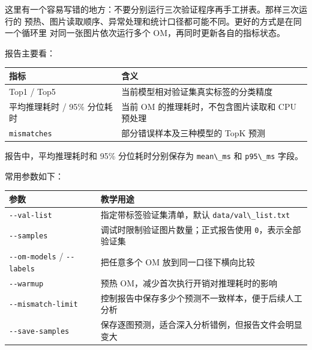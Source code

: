 这里有一个容易写错的地方：不要分别运行三次验证程序再手工拼表。那样三次运行的
预热、图片读取顺序、异常处理和统计口径都可能不同。更好的方式是在同一个循环里
对同一张图片依次运行多个 OM，再同时更新各自的指标状态。

报告主要看：

\begin{longtable}[]{@{}
  >{\raggedright\arraybackslash}p{}
  >{\raggedright\arraybackslash}p{}@{}}
\toprule\noalign{}
\begin{minipage}[b]{\linewidth}\raggedright
指标
\end{minipage} & \begin{minipage}[b]{\linewidth}\raggedright
含义
\end{minipage} \\
\midrule\noalign{}
\endhead
\bottomrule\noalign{}
\endlastfoot
Top1 / Top5 & 当前模型相对验证集真实标签的分类精度 \\
平均推理耗时 / 95\% 分位耗时 & 当前 OM 的推理耗时，不包含图片读取和 CPU
预处理 \\
\passthrough{\lstinline!mismatches!} & 部分错误样本及三种模型的 TopK
预测 \\
\end{longtable}

报告中，平均推理耗时和 95\% 分位耗时分别保存为
\passthrough{\lstinline!mean\_ms!} 和 \passthrough{\lstinline!p95\_ms!}
字段。

常用参数如下：

\begin{longtable}[]{@{}
  >{\raggedright\arraybackslash}p{}
  >{\raggedright\arraybackslash}p{}@{}}
\toprule\noalign{}
\begin{minipage}[b]{\linewidth}\raggedright
参数
\end{minipage} & \begin{minipage}[b]{\linewidth}\raggedright
教学用途
\end{minipage} \\
\midrule\noalign{}
\endhead
\bottomrule\noalign{}
\endlastfoot
\passthrough{\lstinline!--val-list!} & 指定带标签验证集清单，默认
\passthrough{\lstinline!data/val\_list.txt!} \\
\passthrough{\lstinline!--samples!} &
调试时限制验证图片数量；正式报告使用
\passthrough{\lstinline!0!}，表示全部验证集 \\
\passthrough{\lstinline!--om-models!} /
\passthrough{\lstinline!--labels!} & 把任意多个 OM
放到同一口径下横向比较 \\
\passthrough{\lstinline!--warmup!} & 预热
OM，减少首次执行开销对推理耗时的影响 \\
\passthrough{\lstinline!--mismatch-limit!} &
控制报告中保存多少个预测不一致样本，便于后续人工分析 \\
\passthrough{\lstinline!--save-samples!} &
保存逐图预测，适合深入分析错例，但报告文件会明显变大 \\
\end{longtable}

